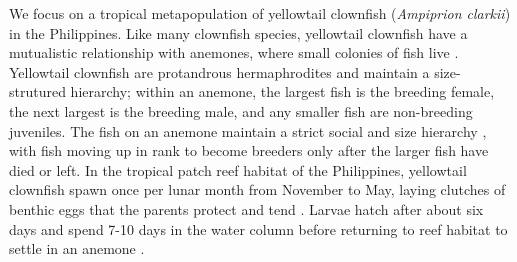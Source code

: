 \documentclass[12pt, oneside]{article}   	%
\begin{document}






We focus on a tropical metapopulation of yellowtail clownfish (\textit{Ampiprion clarkii}) in the Philippines. Like many clownfish species, yellowtail clownfish have a mutualistic relationship with anemones, where small colonies of fish live \citep{buston2003social, fautin1992field}. Yellowtail clownfish are protandrous hermaphrodites and maintain a size-strutured hierarchy; within an anemone, the largest fish is the breeding female, the next largest is the breeding male, and any smaller fish are non-breeding juveniles. The fish on an anemone maintain a strict social and size hierarchy \citep{buston2003social}, with fish moving up in rank to become breeders only after the larger fish have died or left. In the tropical patch reef habitat of the Philippines, yellowtail clownfish spawn once per lunar month from November to May, laying clutches of benthic eggs that the parents protect and tend \citep{ochi1989mating}. Larvae hatch after about six days and spend 7-10 days in the water column before returning to reef habitat to settle in an anemone \citep{fautin1992field}.


\end{document}

